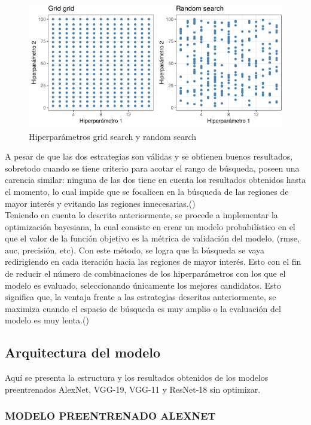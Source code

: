		\begin{figure}[ht]
			\centering
			\includegraphics[scale=0.4]{Figs/121.png}
			\caption{Hiperparámetros grid search y random search}
			\label{fig:Hiperparámetros grid search y random search}
		\end{figure}
		
		A pesar de que las dos estrategias son válidas y se obtienen buenos resultados, sobretodo cuando se tiene criterio para acotar el rango de búsqueda, poseen una carencia similar: ninguna de las dos tiene en cuenta los resultados obtenidos hasta el momento, lo cual impide que se focalicen en la búsqueda de las regiones de mayor interés y evitando las regiones innecesarias.()\\
		
		Teniendo en cuenta lo descrito anteriormente, se procede a implementar la optimización bayesiana, la cual consiste en crear un modelo probabilístico en el que el valor de la función objetivo es la métrica de validación del modelo, (rmse, auc, precisión, etc). Con este método, se logra que la búsqueda se vaya redirigiendo en cada iteración hacia las regiones de mayor interés. Esto con el fin de reducir el número de combinaciones de los hiperparámetros con los que el modelo es evaluado, seleccionando únicamente los mejores candidatos. Esto significa que, la ventaja frente a las estrategias descritas anteriormente, se maximiza cuando el espacio de búsqueda es muy amplio o la evaluación del modelo es muy lenta.()
			
		\subsection{Arquitectura del modelo}
		Aquí se presenta la estructura y los resultados obtenidos de los modelos preentrenados AlexNet, VGG-19, VGG-11 y ResNet-18 sin optimizar.
			\subsubsection{\MakeUppercase{Modelo preentrenado ALEXNET}}
			
